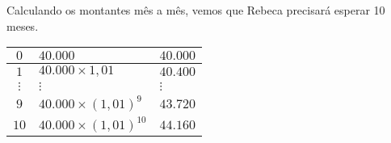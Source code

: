 \documentclass[10 pt,usenames,dvipsnames, oneside]{article}
\begin{document}
\ifdefined\prof
\begin{solucao}

Calculando os montantes mês a mês, vemos que Rebeca precisará esperar 10 meses.
	\begin{table}[H]
	\centering

	\begin{tabu} to \textwidth{|c|l|l|}
	\hline
	\thead
	$0$ & $40.000$ & $40.000$ \\
	\hline
	$1$ & $40.000\times1{,}01$ & $40.400$ \\
	\hline
	$\vdots$ & $\vdots$ & $\vdots$ \\
	\hline
	$9$ & $40.000\times(1{,}01)^9$ & $43.720$ \\
	\hline
	$10$ & $40.000\times(1{,}01)^{10}$ & $44.160$ \\
	\hline
	\end{tabu}
	\end{table}

\end{solucao}
\fi
\end{document}

